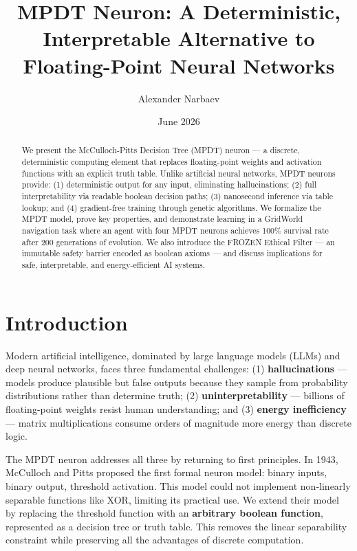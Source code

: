 \documentclass{article}
\title{MPDT Neuron: A Deterministic, Interpretable Alternative to Floating-Point Neural Networks}
\author{Alexander Narbaev}
\date{June 2026}
\begin{document}
\maketitle

\begin{abstract}
We present the McCulloch-Pitts Decision Tree (MPDT) neuron --- a discrete, 
deterministic computing element that replaces floating-point weights and 
activation functions with an explicit truth table. Unlike artificial neural 
networks, MPDT neurons provide: (1) deterministic output for any input, 
eliminating hallucinations; (2) full interpretability via readable boolean 
decision paths; (3) nanosecond inference via table lookup; and (4) gradient-free 
training through genetic algorithms. We formalize the MPDT model, prove key 
properties, and demonstrate learning in a GridWorld navigation task where an 
agent with four MPDT neurons achieves 100\% survival rate after 200 generations 
of evolution. We also introduce the FROZEN Ethical Filter — an immutable safety 
barrier encoded as boolean axioms — and discuss implications for safe, 
interpretable, and energy-efficient AI systems.
\end{abstract}

\section{Introduction}

Modern artificial intelligence, dominated by large language models (LLMs) and 
deep neural networks, faces three fundamental challenges: (1) \textbf{hallucinations} 
--- models produce plausible but false outputs because they sample from probability 
distributions rather than determine truth; (2) \textbf{uninterpretability} --- 
billions of floating-point weights resist human understanding; and (3) 
\textbf{energy inefficiency} --- matrix multiplications consume orders of 
magnitude more energy than discrete logic.

The MPDT neuron addresses all three by returning to first principles. In 1943, 
McCulloch and Pitts proposed the first formal neuron model: binary inputs, binary 
output, threshold activation. This model could not implement non-linearly separable 
functions like XOR, limiting its practical use. We extend their model by replacing 
the threshold function with an \textbf{arbitrary boolean function}, represented as 
a decision tree or truth table. This removes the linear separability constraint 
while preserving all the advantages of discrete computation.
\end{document}
